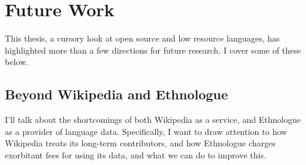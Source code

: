 \section{Future Work}
\label{sec:future-work}

This thesis, a cursory look at open source and low resource languages, has highlighted more than a few directions for future research. I cover some of these below.

\subsection{Beyond Wikipedia and Ethnologue}

I'll talk about the shortcomings of both Wikipedia as a service, and Ethnologue as a provider of language data. Specifically, I want to draw attention to how Wikipedia treats its long-term contributors, and how Ethnologue charges exorbitant fees for using its data, and what we can do to improve this.





%
%
%
%
%
